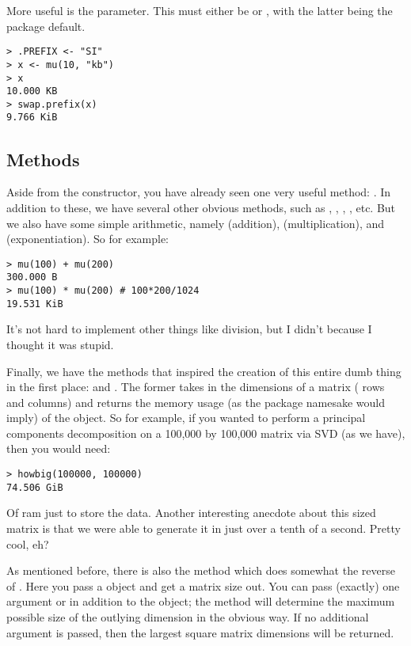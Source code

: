 More useful is the  parameter.  This must either be  or , with the latter being the package default.  
\begin{lstlisting}[language=rr]
> .PREFIX <- "SI"
> x <- mu(10, "kb")
> x
10.000 KB
> swap.prefix(x)
9.766 KiB
\end{lstlisting}



\subsection{Methods}
Aside from the constructor, you have already seen one very useful method:  .  In addition to these, we have several other obvious methods, such as , , , , etc.  But we also have some simple arithmetic, namely  (addition),  (multiplication), and  (exponentiation).  So for example:
\begin{lstlisting}[language=rr]
> mu(100) + mu(200)
300.000 B
> mu(100) * mu(200) # 100*200/1024
19.531 KiB
\end{lstlisting}
It's not hard to implement other things like division, but I didn't because I thought it was stupid.

Finally, we have the methods that inspired the creation of this entire dumb thing in the first place:   and .  The former takes in the dimensions of a matrix ( rows and  columns) and returns the memory usage (as the package namesake would imply) of the object.  So for example, if you wanted to perform a principal components decomposition on a 100,000 by 100,000 matrix via SVD (as we have), then you would need:
\begin{lstlisting}
> howbig(100000, 100000)
74.506 GiB
\end{lstlisting}
Of ram just to store the data.  Another interesting anecdote about this sized matrix is that we were able to generate it in just over a tenth of a second.  Pretty cool, eh?

As mentioned before, there is also the  method which does somewhat the reverse of .  Here you pass a  object and get a matrix size out.  You can pass (exactly) one argument  or  in addition to the  object; the method will determine the maximum possible size of the outlying dimension in the obvious way.  If no additional argument is passed, then the largest square matrix dimensions will be returned.



